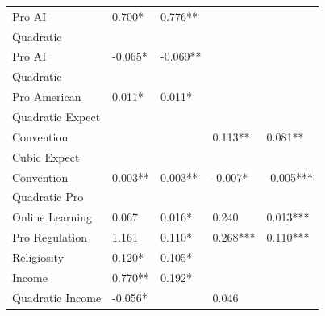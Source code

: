 \documentclass[AER]{./aea-latex-templates/AEA}
\begin{document}
\begin{table}
\begin{tabular}{lllll}
            Pro AI & 0.700* & 0.776** \\ %
            Quadratic
            \\Pro AI & -0.065* & -0.069** \\ %
            Quadratic
            \\Pro American & 0.011* & 0.011* \\ %
            Quadratic Expect
            \\Convention &  &  & 0.113** & 0.081** \\ %
            Cubic Expect
            \\Convention & 0.003** & 0.003** & -0.007* & -0.005*** \\ %
            Quadratic Pro
            \\Online Learning & 0.067 & 0.016* & 0.240 & 0.013*** \\ %
            Pro Regulation & 1.161 & 0.110* & 0.268*** & 0.110*** \\ %
            Religiosity & 0.120* & 0.105* \\ %
            Income & 0.770** & 0.192* \\ %
            Quadratic Income & -0.056* &  & 0.046 &  \\ %

\end{tabular}
\end{table}
\end{document}
